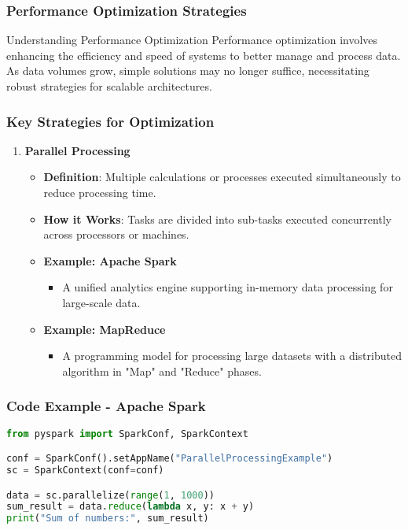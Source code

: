 \documentclass[aspectratio=169]{beamer}
\begin{document}
\begin{frame}[fragile]
    \frametitle{Performance Optimization Strategies}
    \begin{block}{Understanding Performance Optimization}
        Performance optimization involves enhancing the efficiency and speed of systems to better manage and process data.
        As data volumes grow, simple solutions may no longer suffice, necessitating robust strategies for scalable architectures.
    \end{block}
\end{frame}

\begin{frame}[fragile]
    \frametitle{Key Strategies for Optimization}
    \begin{enumerate}
        \item \textbf{Parallel Processing}
        \begin{itemize}
            \item \textbf{Definition}: Multiple calculations or processes executed simultaneously to reduce processing time.
            \item \textbf{How it Works}: Tasks are divided into sub-tasks executed concurrently across processors or machines.
            \item \textbf{Example: Apache Spark}
            \begin{itemize}
                \item A unified analytics engine supporting in-memory data processing for large-scale data.
            \end{itemize}
            \item \textbf{Example: MapReduce}
            \begin{itemize}
                \item A programming model for processing large datasets with a distributed algorithm in "Map" and "Reduce" phases.
            \end{itemize}
        \end{itemize}
    \end{enumerate}
\end{frame}

\begin{frame}[fragile]
    \frametitle{Code Example - Apache Spark}
    \begin{lstlisting}[language=Python]
from pyspark import SparkConf, SparkContext

conf = SparkConf().setAppName("ParallelProcessingExample")
sc = SparkContext(conf=conf)

data = sc.parallelize(range(1, 1000))
sum_result = data.reduce(lambda x, y: x + y)
print("Sum of numbers:", sum_result)
    \end{lstlisting}
\end{frame}
\end{document}
